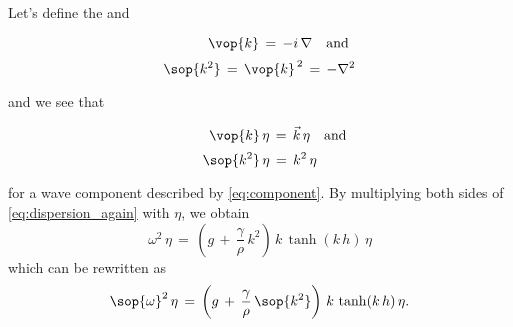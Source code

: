 Let's define the  and 
%
\begin{samepage}%
\begin{equation} \label{eq:opkvec}
\phantom{and\quad}\vop{k} \,=\, -i\,\nabla\quad\text{and}
\end{equation}
%
\begin{equation} \label{eq:opk2}
\sop{k^2} \,=\, \vop{k}^{\,2} \,=\, -\nabla^2
\end{equation}
\end{samepage}%
%
and we see that 
%
\begin{samepage}%
\begin{equation} \label{eq:opkvec1action}
\phantom{and\quad}\vop{k}\,\eta \,=\, \vec{k}\,\eta\quad\text{and}
\end{equation}
%
\begin{equation} \label{eq:opk2action}
\sop{k^2}\,\eta \,=\, k^2\,\eta
\end{equation}
\end{samepage}%
%
for a wave component described by \eqref{eq:component}. By multiplying both sides of \eqref{eq:dispersion_again} with $\eta$, we obtain
%
\begin{equation}
\omega^2\,\eta \,=\, \left(g\,+\,\frac{\gamma}{\rho}\,k^2\right)\,k\,\tanh(k\,h)\,\eta
\end{equation}
%
which can be rewritten as
%
\begin{equation} \label{eq:diffeqbad}
\sop{\omega}^2\,\eta \,=\, \left(g\,+\,\frac{\gamma}{\rho}\,\sop{k^2}\right)\,k\,\tanh(k\,h)\,\eta.
\end{equation}

